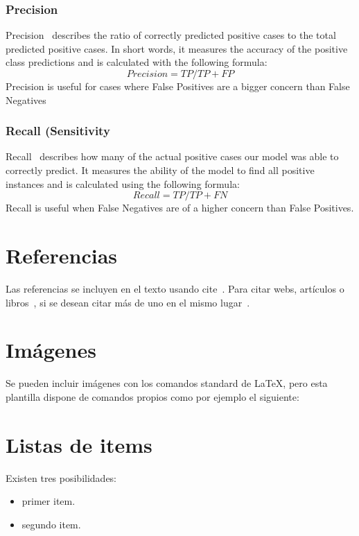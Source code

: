 \subsubsection{Precision}
Precision~\cite{evaluation_metrics} describes the ratio of correctly predicted positive cases to the total predicted positive cases. In short words, it measures the accuracy of the positive class predictions and is calculated with the following formula:
\[ Precision = {TP}/{TP + FP} \]
Precision is useful for cases where False Positives are a bigger concern than False Negatives

\subsubsection{Recall (Sensitivity}
Recall~\cite{evaluation_metrics} describes how many of the actual positive cases our model was able to correctly predict. It measures the ability of the model to find all positive instances and is calculated using the following formula:
\[ Recall = {TP}/{TP + FN} \]
Recall is useful when False Negatives are of a higher concern than False Positives.


\section{Referencias}

Las referencias se incluyen en el texto usando cite~\cite{wiki:latex}. Para citar webs, artículos o libros~\cite{koza92}, si se desean citar más de uno en el mismo lugar~\cite{bortolot2005, koza92}.


\section{Imágenes}

Se pueden incluir imágenes con los comandos standard de \LaTeX, pero esta plantilla dispone de comandos propios como por ejemplo el siguiente:




\section{Listas de items}

Existen tres posibilidades:

\begin{itemize}
	\item primer item.
	\item segundo item.
\end{itemize}

